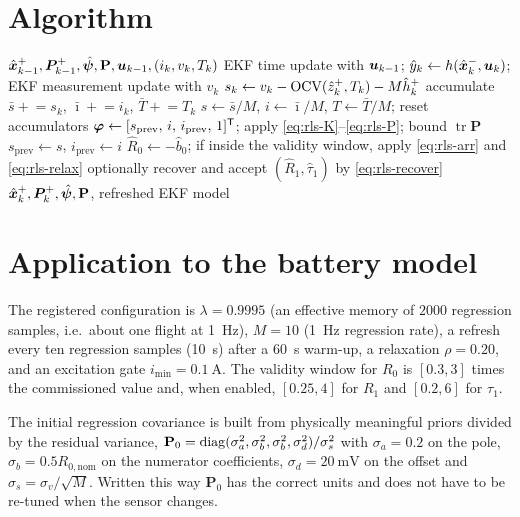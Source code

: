 \section{Algorithm}
\begin{algorithm}[H]
\caption{RLS-EKF --- one sampling period (raw rate) plus one regression sample every $M$}
\begin{algorithmic}[1]
\Require $\hat{\bm{x}}^{+}_{k-1},\bm{P}^+_{k-1},\hat{\bm{\psi}},\mathbf{P},\bm{u}_{k-1},(i_k,v_k,T_k)$
\State EKF time update with $\bm{u}_{k-1}$; $\hat{y}_k\gets h(\hat{\bm{x}}^{-}_k,\bm{u}_k)$; EKF measurement update with $v_k$
\State $s_k\gets v_k-\mathrm{OCV}(\hat{z}^+_k,T_k)-M\hat h^+_k$ 
\State accumulate $\bar s\mathrel{+}=s_k$, $\bar\imath\mathrel{+}=i_k$, $\bar T\mathrel{+}=T_k$
  \State $s\gets\bar s/M$, $i\gets\bar\imath/M$, $T\gets\bar T/M$; reset accumulators
     \State $\bm{\varphi}\gets[s_\text{prev},\,i,\,i_\text{prev},\,1]^{\mathsf{T}}$; apply \eqref{eq:rls-K}--\eqref{eq:rls-P}; bound $\operatorname{tr}\mathbf{P}$
  \EndIf
  \State $s_\text{prev}\gets s$, $i_\text{prev}\gets i$
     \State $\hat R_0\gets-\hat b_0$; if inside the validity window, apply \eqref{eq:rls-arr} and \eqref{eq:rls-relax}
     \State optionally recover and accept $(\hat R_1,\hat\tau_1)$ by \eqref{eq:rls-recover}
  \EndIf
\EndIf
\Ensure $\hat{\bm{x}}^{+}_k,\bm{P}^+_k,\hat{\bm{\psi}},\mathbf{P}$, refreshed EKF model
\end{algorithmic}
\end{algorithm}

\section{Application to the battery model}
The registered configuration is $\lambda=0.9995$ (an effective memory of $2000$ regression samples,
i.e.\ about one flight at \SI{1}{\hertz}), $M=10$ (\SI{1}{\hertz} regression rate), a refresh every
ten regression samples (\SI{10}{\second}) after a \SI{60}{\second} warm-up, a relaxation
$\rho=0.20$, and an excitation gate $i_{\min}=\SI{0.1}{\ampere}$.  The validity window for $R_0$ is
$[0.3,3]$ times the commissioned value and, when enabled, $[0.25,4]$ for $R_1$ and $[0.2,6]$ for
$\tau_1$.

The initial regression covariance is built from physically meaningful priors divided by the residual
variance, $\mathbf{P}_0=\operatorname{diag}(\sigma^2_{a},\sigma^2_{b},\sigma^2_{b},\sigma^2_{d})/\sigma_s^2$ with
$\sigma_a=0.2$ on the pole, $\sigma_b=0.5R_{0,\text{nom}}$ on the numerator coefficients,
$\sigma_d=\SI{20}{\milli\volt}$ on the offset and $\sigma_s=\sigma_v/\sqrt{M}$.  Written this way
$\mathbf{P}_0$ has the correct units and does not have to be re-tuned when the sensor changes.

